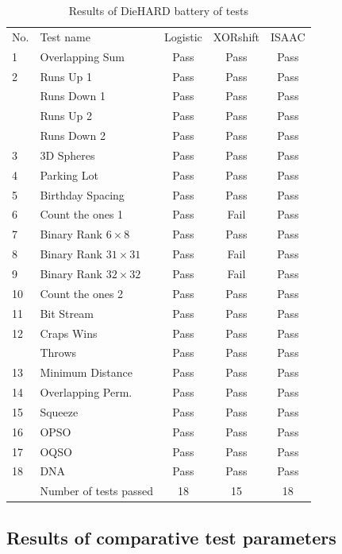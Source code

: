 \begin{tiny}
\begin{table}[!t]
\renewcommand{\arraystretch}{1.3}
\caption{Results of DieHARD battery of tests}
\label{Results of DieHARD battery}
\centering
\begin{tabular}{llccc} \toprule
No. &Test name &Logistic& XORshift& ISAAC\\
1 & Overlapping Sum  &Pass &Pass&Pass\\
2 & Runs Up 1  & Pass &Pass&Pass\\
&Runs Down 1  &Pass &Pass&Pass\\
&Runs Up 2  &Pass &Pass&Pass\\
&Runs Down 2  & Pass &Pass&Pass\\
3 & 3D Spheres  &Pass &Pass&Pass\\
4 & Parking Lot  &Pass &Pass&Pass\\
5 & Birthday Spacing  &Pass &Pass&Pass\\
6 & Count the ones 1  &Pass &Fail&Pass\\
7 &Binary Rank $6 \times 8$  & Pass &Pass&Pass\\
8 &Binary Rank $31 \times 31$  &Pass &Fail&Pass\\
9 &Binary Rank $32 \times 32$  &Pass &Fail&Pass\\
10 &Count the ones 2  &Pass&Pass&Pass \\
11 &Bit Stream  &Pass&Pass&Pass \\
12 &Craps Wins  &Pass&Pass&Pass \\
&Throws &Pass  &Pass&Pass\\
13 &Minimum Distance  &Pass &Pass&Pass\\
14 &Overlapping Perm.  &Pass &Pass&Pass\\
15 &Squeeze &Pass &Pass&Pass \\
16 &OPSO &Pass &Pass&Pass \\
17 &OQSO &Pass &Pass&Pass \\
18 &DNA &Pass &Pass &Pass\\
&Number of tests passed  &18 &15&18\\\bottomrule
\end{tabular}
\end{table}
\end{tiny}

\subsection{Results of comparative test parameters}



